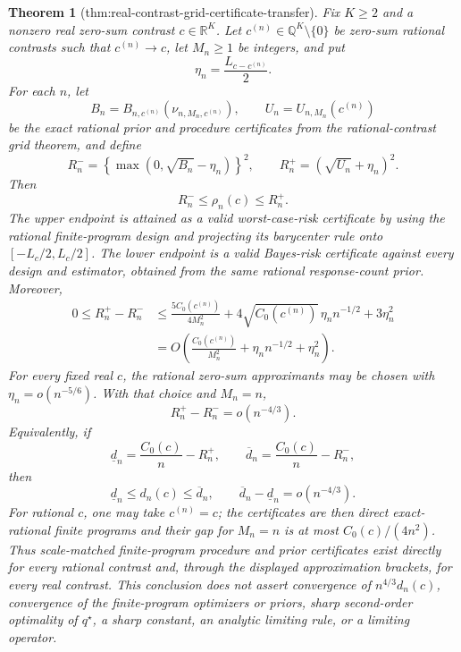\documentclass{article}
\newtheorem{theorem}{Theorem}
\begin{document}
\begin{theorem}[thm:real-contrast-grid-certificate-transfer]\label{thm:real-contrast-grid-certificate-transfer}
Fix \(K\geq2\) and a nonzero real zero-sum contrast \(c\in\mathbb R^K\).  Let \(c^{(n)}\in\mathbb Q^K\setminus\{0\}\) be zero-sum rational contrasts such that \(c^{(n)}\to c\), let \(M_n\geq1\) be integers, and put
\[
 \eta_n=\frac{L_{c-c^{(n)}}}{2}.
\]
For each \(n\), let
\[
 B_n=B_{n,c^{(n)}}(\nu_{n,M_n,c^{(n)}}),
 \qquad
 U_n=U_{n,M_n}(c^{(n)})
\]
be the exact rational prior and procedure certificates from the rational-contrast grid theorem, and define
\[
 R_n^-=\left\{\max(0,\sqrt{B_n}-\eta_n)\right\}^2,
 \qquad
 R_n^+=(\sqrt{U_n}+\eta_n)^2.
\]
Then
\[
 R_n^-\leq\rho_n(c)\leq R_n^+.
\]
The upper endpoint is attained as a valid worst-case-risk certificate by using the rational finite-program design and projecting its barycenter rule onto \([-L_c/2,L_c/2]\).  The lower endpoint is a valid Bayes-risk certificate against every design and estimator, obtained from the same rational response-count prior.  Moreover,
\[
 \begin{aligned}
 0\leq R_n^+-R_n^-
 &\leq \frac{5C_0(c^{(n)})}{4M_n^2}
 +4\sqrt{C_0(c^{(n)})}\,\eta_n n^{-1/2}
 +3\eta_n^2\\
 &=O\!\left(\frac{C_0(c^{(n)})}{M_n^2}
 +\eta_n n^{-1/2}+\eta_n^2\right).
 \end{aligned}
\]
For every fixed real \(c\), the rational zero-sum approximants may be chosen with \(\eta_n=o(n^{-5/6})\).  With that choice and \(M_n=n\),
\[
 R_n^+-R_n^-=o(n^{-4/3}).
\]
Equivalently, if
\[
 \underline d_n=\frac{C_0(c)}n-R_n^+,
 \qquad
 \overline d_n=\frac{C_0(c)}n-R_n^-,
\]
then
\[
 \underline d_n\leq d_n(c)\leq\overline d_n,
 \qquad
 \overline d_n-\underline d_n=o(n^{-4/3}).
\]
For rational \(c\), one may take \(c^{(n)}=c\); the certificates are then direct exact-rational finite programs and their gap for \(M_n=n\) is at most \(C_0(c)/(4n^2)\).  Thus scale-matched finite-program procedure and prior certificates exist directly for every rational contrast and, through the displayed approximation brackets, for every real contrast.  This conclusion does not assert convergence of \(n^{4/3}d_n(c)\), convergence of the finite-program optimizers or priors, sharp second-order optimality of \(q^\star\), a sharp constant, an analytic limiting rule, or a limiting operator.
\end{theorem}
\end{document}
